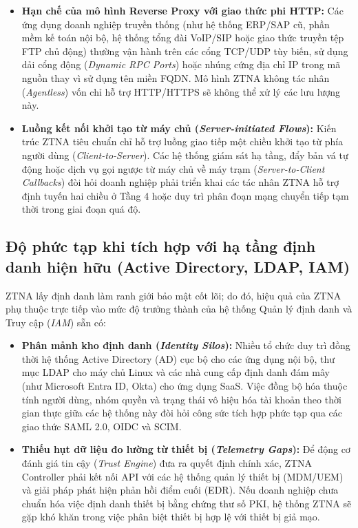 \begin{itemize}
    \item \textbf{Hạn chế của mô hình Reverse Proxy với giao thức phi HTTP:} Các ứng dụng doanh nghiệp truyền thống (như hệ thống ERP/SAP cũ, phần mềm kế toán nội bộ, hệ thống tổng đài VoIP/SIP hoặc giao thức truyền tệp FTP chủ động) thường vận hành trên các cổng TCP/UDP tùy biến, sử dụng dải cổng động (\textit{Dynamic RPC Ports}) hoặc nhúng cứng địa chỉ IP trong mã nguồn thay vì sử dụng tên miền FQDN. Mô hình ZTNA không tác nhân (\textit{Agentless}) vốn chỉ hỗ trợ HTTP/HTTPS sẽ không thể xử lý các lưu lượng này.
    \item \textbf{Luồng kết nối khởi tạo từ máy chủ (\textit{Server-initiated Flows}):} Kiến trúc ZTNA tiêu chuẩn chỉ hỗ trợ luồng giao tiếp một chiều khởi tạo từ phía người dùng (\textit{Client-to-Server}). Các hệ thống giám sát hạ tầng, đẩy bản vá tự động hoặc dịch vụ gọi ngược từ máy chủ về máy trạm (\textit{Server-to-Client Callbacks}) đòi hỏi doanh nghiệp phải triển khai các tác nhân ZTNA hỗ trợ định tuyến hai chiều ở Tầng 4 hoặc duy trì phân đoạn mạng chuyển tiếp tạm thời trong giai đoạn quá độ.
\end{itemize}

\subsection{Độ phức tạp khi tích hợp với hạ tầng định danh hiện hữu (Active Directory, LDAP, IAM)}
\label{subsec:5_2_2}

ZTNA lấy định danh làm ranh giới bảo mật cốt lõi; do đó, hiệu quả của ZTNA phụ thuộc trực tiếp vào mức độ trưởng thành của hệ thống Quản lý định danh và Truy cập (\textit{IAM}) sẵn có:

\begin{itemize}
    \item \textbf{Phân mảnh kho định danh (\textit{Identity Silos}):} Nhiều tổ chức duy trì đồng thời hệ thống Active Directory (AD) cục bộ cho các ứng dụng nội bộ, thư mục LDAP cho máy chủ Linux và các nhà cung cấp định danh đám mây (như Microsoft Entra ID, Okta) cho ứng dụng SaaS. Việc đồng bộ hóa thuộc tính người dùng, nhóm quyền và trạng thái vô hiệu hóa tài khoản theo thời gian thực giữa các hệ thống này đòi hỏi công sức tích hợp phức tạp qua các giao thức SAML 2.0, OIDC và SCIM.
    \item \textbf{Thiếu hụt dữ liệu đo lường từ thiết bị (\textit{Telemetry Gaps}):} Để động cơ đánh giá tin cậy (\textit{Trust Engine}) đưa ra quyết định chính xác, ZTNA Controller phải kết nối API với các hệ thống quản lý thiết bị (MDM/UEM) và giải pháp phát hiện phản hồi điểm cuối (EDR). Nếu doanh nghiệp chưa chuẩn hóa việc định danh thiết bị bằng chứng thư số PKI, hệ thống ZTNA sẽ gặp khó khăn trong việc phân biệt thiết bị hợp lệ với thiết bị giả mạo.
\end{itemize}

